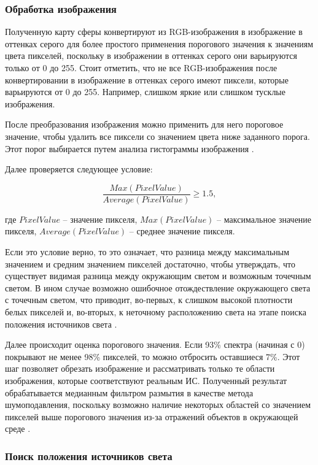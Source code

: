 \subsubsection*{Обработка изображения}

Полученную карту сферы конвертируют из RGB-изображения в изображение в оттенках серого для более простого применения порогового значения к
значениям цвета пикселей, поскольку в изображении в оттенках серого они варьируются только от 0 до 255. Стоит отметить, что не все RGB-изображения после конвертировании в изображение в оттенках серого имеют пиксели, которые варьируются от 0 до 255. Например, слишком яркие или слишком тусклые изображения.

После преобразования изображения можно применить для него пороговое значение, чтобы удалить все пиксели со значением цвета ниже заданного порога. Этот порог выбирается путем анализа гистограммы изображения \cite{img_hists}.

Далее проверяется следующее условие:

\begin{equation}
	\frac{Max(PixelValue)}{Average(PixelValue)} \geq 1.5,
\end{equation}

где $PixelValue$ -- значение пикселя, $Max(PixelValue)$ -- максимальное значение пикселя, $Average(PixelValue)$ -- среднее значение пикселя.

Если это условие верно, то это означает, что разница между максимальным значением и средним значением пикселей достаточно, чтобы утверждать, что существует видимая разница между окружающим светом и возможным точечным светом. В ином случае возможно ошибочное отождествление окружающего света с точечным светом, что приводит, во-первых, к слишком высокой плотности белых пикселей и, во-вторых, к неточному расположению света на этапе поиска положения источников света \cite{osti2019real}.

Далее происходит оценка порогового значения. Если 93\% спектра (начиная с 0) покрывают не менее 98\% пикселей, то можно отбросить оставшиеся 7\%. Этот шаг позволяет обрезать изображение и рассматривать только те области изображения, которые соответствуют реальным ИС. Полученный результат обрабатывается медианным фильтром размытия в качестве метода шумоподавления, поскольку возможно наличие некоторых областей со значением пикселей выше порогового значения из-за отражений объектов в окружающей среде \cite{osti2019real}.

\subsubsection*{Поиск положения источников света}

